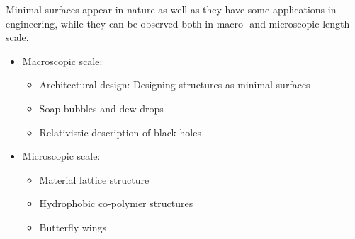 \documentclass[11pt]{scrartcl}
\begin{document}
Minimal surfaces appear in nature as well as they have some applications in engineering, while they can be observed both in macro- and microscopic length scale.
\begin{itemize}
	\item Macroscopic scale:
	\begin{itemize}
		\item Architectural design: Designing structures as minimal surfaces 
		\item Soap bubbles and dew drops
		\item Relativistic description of black holes
	\end{itemize}
	\item Microscopic scale:
	\begin{itemize}
		\item Material lattice structure
		\item Hydrophobic co-polymer structures
		\item Butterfly wings
	\end{itemize} 
\end{itemize}
\end{document}
